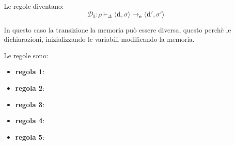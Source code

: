 Le regole diventano:
\[
    \mathcal{D}_\mathbf{i} : \rho \vdash_\Delta \langle \mathbf{d}, \sigma \rangle \to_\mathbf{e} \langle \mathbf{d'}, \sigma' \rangle
\]

In questo caso la transizione la memoria può essere diversa, questo perchè le dichiarazioni, inizializzando le variabili modificando la memoria.

Le regole sono:
\begin{itemize}[label=$\triangleright$, itemsep=\smallskipamount]
    \item \textbf{regola 1}:
    \item \textbf{regola 2}:
    \item \textbf{regola 3}:
    \item \textbf{regola 4}:
    \item \textbf{regola 5}:

\end{itemize}
